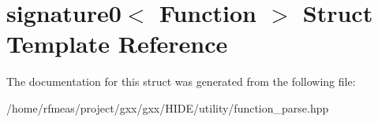 \hypertarget{structsignature0}{}\section{signature0$<$ Function $>$ Struct Template Reference}
\label{structsignature0}


The documentation for this struct was generated from the following file\+:\begin{DoxyCompactItemize}
\item 
/home/rfmeas/project/gxx/gxx/\+H\+I\+D\+E/utility/function\+\_\+parse.\+hpp\end{DoxyCompactItemize}
